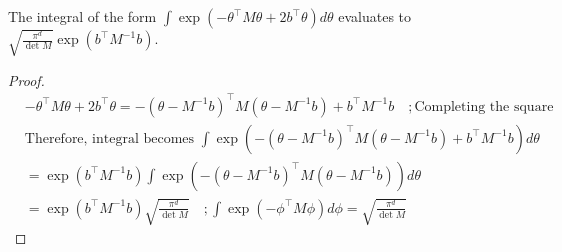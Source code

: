 \begin{lemma} \label{lm:std_gaussian_int} The integral of the form 
$\int \exp\left(-\theta^\top M \theta + 2b^\top \theta\right) d\theta$ evaluates to $\sqrt{\frac{\pi^d}{\det M}} \exp\left(b^\top M^{-1}b\right).$

\begin{proof}
\begin{align*}
    &-\theta^\top M \theta + 2b^\top \theta = -(\theta - M^{-1}b)^\top M (\theta - M^{-1}b) + b^\top M^{-1}b \quad; \text{Completing the square} \\
    &\text{Therefore, integral becomes } \int \exp\left(-(\theta - M^{-1}b)^\top M (\theta - M^{-1}b) + b^\top M^{-1}b\right) d\theta \\
    &= \exp\left(b^\top M^{-1}b\right) \int \exp\left(-(\theta - M^{-1}b)^\top M (\theta - M^{-1}b)\right) d\theta \\
    &= \exp\left(b^\top M^{-1}b\right) \sqrt{\frac{\pi^d}{\det M}} \quad; \int \exp\left(-\phi^\top M \phi\right) d\phi = \sqrt{\frac{\pi^d}{\det M}}
\end{align*}
\end{proof}
\end{lemma}

